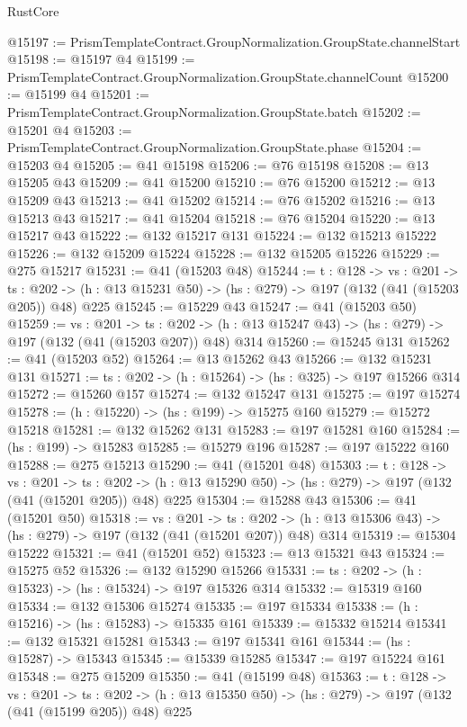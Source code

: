 \begin{lexlean}{RustCore}
\begin{coremodule}
@15197 := PrismTemplateContract.GroupNormalization.GroupState.channelStart
@15198 := @15197 @4
@15199 := PrismTemplateContract.GroupNormalization.GroupState.channelCount
@15200 := @15199 @4
@15201 := PrismTemplateContract.GroupNormalization.GroupState.batch
@15202 := @15201 @4
@15203 := PrismTemplateContract.GroupNormalization.GroupState.phase
@15204 := @15203 @4
@15205 := @41 @15198
@15206 := @76 @15198
@15208 := @13 @15205 @43
@15209 := @41 @15200
@15210 := @76 @15200
@15212 := @13 @15209 @43
@15213 := @41 @15202
@15214 := @76 @15202
@15216 := @13 @15213 @43
@15217 := @41 @15204
@15218 := @76 @15204
@15220 := @13 @15217 @43
@15222 := @132 @15217 @131
@15224 := @132 @15213 @15222
@15226 := @132 @15209 @15224
@15228 := @132 @15205 @15226
@15229 := @275 @15217
@15231 := @41 (@15203 @48)
@15244 := {t : @128} ->
  {vs : @201} ->
  {ts : @202} -> (h : @13 @15231 @50) -> (hs : @279) -> @197 (@132 (@41 (@15203 @205)) @48) @225
@15245 := @15229 @43
@15247 := @41 (@15203 @50)
@15259 := {vs : @201} ->
  {ts : @202} -> (h : @13 @15247 @43) -> (hs : @279) -> @197 (@132 (@41 (@15203 @207)) @48) @314
@15260 := @15245 @131
@15262 := @41 (@15203 @52)
@15264 := @13 @15262 @43
@15266 := @132 @15231 @131
@15271 := {ts : @202} -> (h : @15264) -> (hs : @325) -> @197 @15266 @314
@15272 := @15260 @157
@15274 := @132 @15247 @131
@15275 := @197 @15274
@15278 := (h : @15220) -> (hs : @199) -> @15275 @160
@15279 := @15272 @15218
@15281 := @132 @15262 @131
@15283 := @197 @15281 @160
@15284 := (hs : @199) -> @15283
@15285 := @15279 @196
@15287 := @197 @15222 @160
@15288 := @275 @15213
@15290 := @41 (@15201 @48)
@15303 := {t : @128} ->
  {vs : @201} ->
  {ts : @202} -> (h : @13 @15290 @50) -> (hs : @279) -> @197 (@132 (@41 (@15201 @205)) @48) @225
@15304 := @15288 @43
@15306 := @41 (@15201 @50)
@15318 := {vs : @201} ->
  {ts : @202} -> (h : @13 @15306 @43) -> (hs : @279) -> @197 (@132 (@41 (@15201 @207)) @48) @314
@15319 := @15304 @15222
@15321 := @41 (@15201 @52)
@15323 := @13 @15321 @43
@15324 := @15275 @52
@15326 := @132 @15290 @15266
@15331 := {ts : @202} -> (h : @15323) -> (hs : @15324) -> @197 @15326 @314
@15332 := @15319 @160
@15334 := @132 @15306 @15274
@15335 := @197 @15334
@15338 := (h : @15216) -> (hs : @15283) -> @15335 @161
@15339 := @15332 @15214
@15341 := @132 @15321 @15281
@15343 := @197 @15341 @161
@15344 := (hs : @15287) -> @15343
@15345 := @15339 @15285
@15347 := @197 @15224 @161
@15348 := @275 @15209
@15350 := @41 (@15199 @48)
@15363 := {t : @128} ->
  {vs : @201} ->
  {ts : @202} -> (h : @13 @15350 @50) -> (hs : @279) -> @197 (@132 (@41 (@15199 @205)) @48) @225

\end{coremodule}
\end{lexlean}
